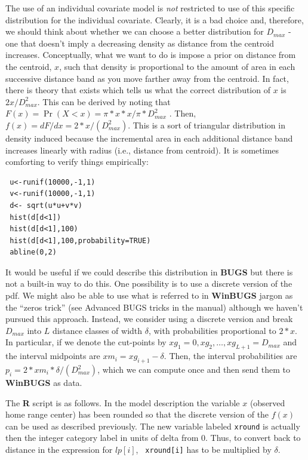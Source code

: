 The use of an individual covariate model is {\it not} restricted to
use of this specific distribution for the individual
covariate. Clearly, it is a bad choice and, therefore, we should think
about whether we can choose a better distribution for $D_{max}$ - one that
doesn't imply a decreasing density as distance from the centroid
increases.  Conceptually, what we want to do is impose a prior on
distance from the centroid, $x$, such that density is proportional to
the amount of area in each successive distance band as you move
farther away from the centroid.  In fact, there is theory that exists
which tells us what the correct distribution of $x$ is
$2x/D_{max}^2$. This can be derived by noting that $F(x) = \Pr(X<x) =
\pi*x*x/\pi*D_{max}^{2}$ . Then, $f(x) = dF/dx =
2*x/(D_{max}^{2})$. This is a sort of triangular distribution in
density
induced because the incremental area in each additional distance band
increases linearly with radius (i.e., distance from centroid). It is
sometimes comforting to verify things empirically:
{\small
\begin{verbatim}
 u<-runif(10000,-1,1)
 v<-runif(10000,-1,1)
 d<- sqrt(u*u+v*v)
 hist(d[d<1])
 hist(d[d<1],100)
 hist(d[d<1],100,probability=TRUE)
 abline(0,2)
\end{verbatim}
}

It would be useful if we could describe this distribution in {\bf BUGS} but
there is not a built-in way to do this.  One possibility is to use a
discrete version of the pdf. We might also be able to use what is
referred to in {\bf WinBUGS} jargon as the ``zeros trick'' (see Advanced
BUGS tricks in the manual) although we haven't pursued this approach. Instead, we
consider using a discrete version and break $D_{max}$ into $L$ distance
classes of width $\delta$, with probabilities proportional to
$2*x$. In particular, if we denote the cut-points by $xg_{1}=0,xg_{2}, \ldots,
xg_{L+1}=D_{max}$ and the interval midpoints are $xm_{i} = 
xg_{i+1}-\delta$. Then, the interval probabilities are $p_{i} = 
2*xm_{i}*\delta/(D_{max}^{2})$, which we can compute once and then send
them to {\bf WinBUGS} as data.

The {\bf R} script is as follows. In the model description the
variable $x$ (observed home range center) has been rounded so that the
discrete version of the $f(x)$ can be used as described
previously. The new variable labeled \mbox{\tt xround} is actually
then the integer category label in units of delta from 0. Thus, to
convert back to distance in the expression for $lp[i]$, \mbox{\tt
  xround[i]} has to be multiplied by $\delta$.

